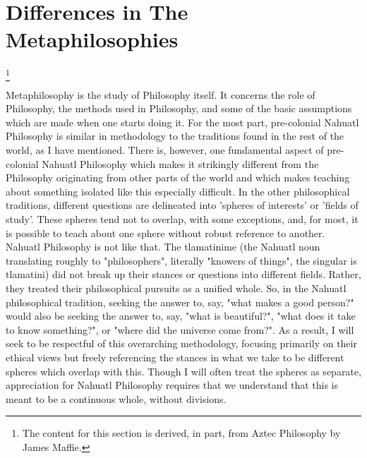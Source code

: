 \section{Differences in The Metaphilosophies}\footnote{The content for this section is derived, in part, from Aztec Philosophy by James Maffie.\autocite{Maffie1}}

Metaphilosophy is the study of Philosophy itself. It concerns the role of Philosophy, the methods used in Philosophy, and some of the basic assumptions which are made when one starts doing it. For the most part, pre-colonial Nahuatl Philosophy is similar in methodology to the traditions found in the rest of the world, as I have mentioned. There is, however, one fundamental aspect of pre-colonial Nahuatl Philosophy which makes it strikingly different from the Philosophy originating from other parts of the world and which makes teaching about something isolated like this especially difficult. In the other philosophical traditions, different questions are delineated into 'spheres of interests' or 'fields of study'. These spheres tend not to overlap, with some exceptions, and, for most, it is possible to teach about one sphere without robust reference to another. Nahuatl Philosophy is not like that. The tlamatinime (the Nahuatl noun translating roughly to "philosophers", literally "knowers of things", the singular is tlamatini) did not break up their stances or questions into different fields. Rather, they treated their philosophical pursuits as a unified whole. So, in the Nahuatl philosophical tradition, seeking the answer to, say, "what makes a good person?" would also be seeking the answer to, say, "what is beautiful?", "what does it take to know something?", or "where did the universe come from?". As a result, I will seek to be respectful of this overarching methodology, focusing primarily on their ethical views but freely referencing the stances in what we take to be different spheres which overlap with this. Though I will often treat the spheres as separate, appreciation for Nahuatl Philosophy requires that we understand that this is meant to be a continuous whole, without divisions.

